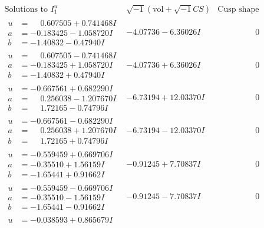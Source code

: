 \documentclass[1p]{elsarticle_modified}
\theoremstyle{definition}
\newcommand{\I}{\sqrt{-1}}
\begin{document}
$$\begin{array}{c|c|c}  
\text{Solutions to }I^u_{1}& \I (\text{vol} + \sqrt{-1}CS) & \text{Cusp shape}\\
 \hline 
\begin{aligned}
u &= \phantom{-}0.607505 + 0.741468 I \\
a &= -0.183425 - 1.058720 I \\
b &= -1.40832 - 0.47940 I\end{aligned}
 & -4.07736 - 6.36026 I & \phantom{-0.000000 } 0 \\ \hline\begin{aligned}
u &= \phantom{-}0.607505 - 0.741468 I \\
a &= -0.183425 + 1.058720 I \\
b &= -1.40832 + 0.47940 I\end{aligned}
 & -4.07736 + 6.36026 I & \phantom{-0.000000 } 0 \\ \hline\begin{aligned}
u &= -0.667561 + 0.682290 I \\
a &= \phantom{-}0.256038 - 1.207670 I \\
b &= \phantom{-}1.72165 - 0.74796 I\end{aligned}
 & -6.73194 + 12.03370 I & \phantom{-0.000000 } 0 \\ \hline\begin{aligned}
u &= -0.667561 - 0.682290 I \\
a &= \phantom{-}0.256038 + 1.207670 I \\
b &= \phantom{-}1.72165 + 0.74796 I\end{aligned}
 & -6.73194 - 12.03370 I & \phantom{-0.000000 } 0 \\ \hline\begin{aligned}
u &= -0.559459 + 0.669706 I \\
a &= -0.35510 + 1.56159 I \\
b &= -1.65441 + 0.91662 I\end{aligned}
 & -0.91245 + 7.70837 I & \phantom{-0.000000 } 0 \\ \hline\begin{aligned}
u &= -0.559459 - 0.669706 I \\
a &= -0.35510 - 1.56159 I \\
b &= -1.65441 - 0.91662 I\end{aligned}
 & -0.91245 - 7.70837 I & \phantom{-0.000000 } 0 \\ \hline\begin{aligned}
u &= -0.038593 + 0.865679 I \\

\end{aligned}
\end{array}$$
\end{document}
